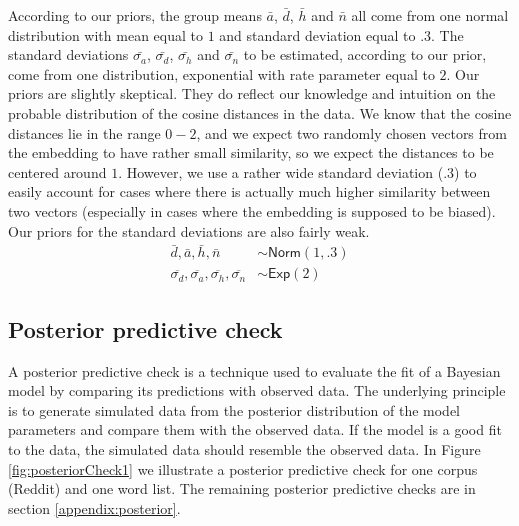 \documentclass[
  12pt,
  dvipsnames,enabledeprecatedfontcommands]{scrartcl}
\begin{document}
According to our priors, the group means \(\bar{a}\), \(\bar{d}\),
\(\bar{h}\) and \(\bar{n}\) all come from one normal distribution with
mean equal to \(1\) and standard deviation equal to \(.3\). The standard
deviations \(\bar{\sigma_a}\), \(\bar{\sigma_d}\), \(\bar{\sigma_h}\)
and \(\bar{\sigma_n}\) to be estimated, according to our prior, come
from one distribution, exponential with rate parameter equal to \(2\).
Our priors are slightly skeptical. They do reflect our knowledge and
intuition on the probable distribution of the cosine distances in the
data. We know that the cosine distances lie in the range \(0-2\), and we
expect two randomly chosen vectors from the embedding to have rather
small similarity, so we expect the distances to be centered around
\(1\). However, we use a rather wide standard deviation (\(.3\)) to
easily account for cases where there is actually much higher similarity
between two vectors (especially in cases where the embedding is supposed
to be biased). Our priors for the standard deviations are also fairly
weak. \begin{align*}
\bar{d}, \bar{a}, \bar{h}, \bar{n} &\sim \mathsf{Norm}(1, .3)\\ 
\overline{\sigma_d}, \overline{\sigma_a},  \overline{\sigma_h},  \overline{\sigma_n}  &\sim \mathsf{Exp}(2)
\end{align*}

\hypertarget{posterior-predictive-check}{%
\subsection{Posterior predictive
check}\label{posterior-predictive-check}}

\label{subsec:posterior}

A posterior predictive check is a technique used to evaluate the fit of
a Bayesian model by comparing its predictions with observed data. The
underlying principle is to generate simulated data from the posterior
distribution of the model parameters and compare them with the observed
data. If the model is a good fit to the data, the simulated data should
resemble the observed data. In Figure \ref{fig:posteriorCheck1} we
illustrate a posterior predictive check for one corpus (Reddit) and one
word list. The remaining posterior predictive checks are in section
\ref{appendix:posterior}.
\end{document}
